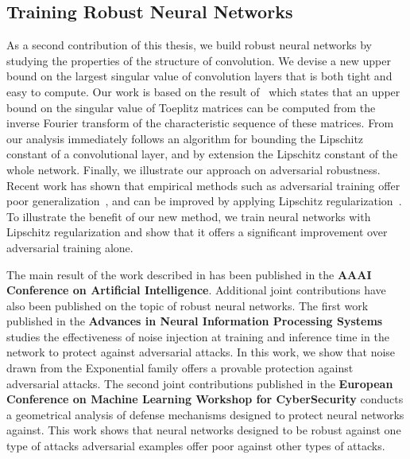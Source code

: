 


\subsection{Training Robust Neural Networks}
\label{subsection:ch1-training_robust_neural_networks}

As a second contribution of this thesis, we build robust neural networks by studying the properties of the structure of convolution.
We devise a new upper bound on the largest singular value of convolution layers that is both tight and easy to compute.
Our work is based on the result of~\citet{gray2006toeplitz} which states that an upper bound on the singular value of Toeplitz matrices can be computed from the inverse Fourier transform of the characteristic sequence of these matrices.
From our analysis immediately follows an algorithm for bounding the Lipschitz constant of a convolutional layer, and by extension the Lipschitz constant of the whole network.
Finally, we illustrate our approach on adversarial robustness.
Recent work has shown that empirical methods such as adversarial training offer poor generalization~\cite{schmidt2018adversarially}, and can be improved by applying Lipschitz regularization~\cite{farnia2018generalizable}.
To illustrate the benefit of our new method, we train neural networks with Lipschitz regularization and show that it offers a significant improvement over adversarial training alone.

The main result of the work described in  has been published in the \textbf{\color{mydarkblue} AAAI Conference on Artificial Intelligence}.
Additional joint contributions have also been published on the topic of robust neural networks.
The first work published in the \textbf{\color{mydarkblue} Advances in Neural Information Processing Systems} studies the effectiveness of noise injection at training and inference time in the network to protect against adversarial attacks.
In this work, we show that noise drawn from the Exponential family offers a provable protection against adversarial attacks. 
The second joint contributions published in the \textbf{\color{mydarkblue} European Conference on Machine Learning Workshop for CyberSecurity} conducts a geometrical analysis of defense mechanisms designed to protect neural networks against.
This work shows that neural networks designed to be robust against one type of attacks adversarial examples offer poor against other types of attacks.



